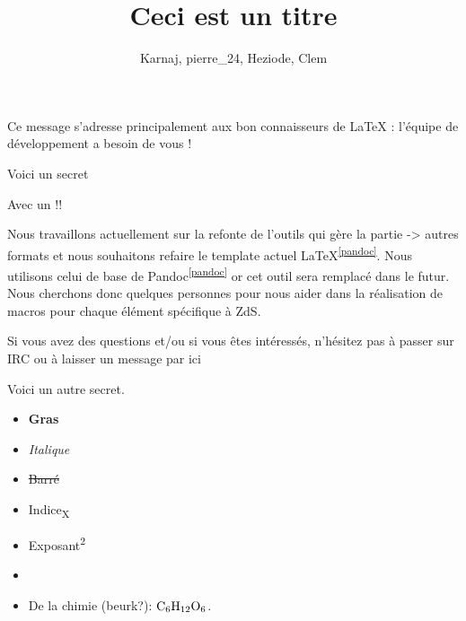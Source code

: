 \documentclass[small]{zmdocument}
\title{Ceci est un titre}
\author{Karnaj, pierre\_24, Heziode, Clem}
\begin{document}
\maketitle
\tableofcontents
\newpage

\levelOneIntroduction

Ce message s’adresse principalement aux bon connaisseurs de LaTeX : l’équipe de développement a besoin de vous ! 

\begin{Spoiler}
   Voici un secret

   Avec un !!
\end{Spoiler}


Nous travaillons actuellement sur la refonte de l’outils qui gère la partie  -> autres formats et nous souhaitons refaire le template actuel LaTeX\textsuperscript{\ref{pandoc}}. Nous utilisons celui de base de Pandoc\textsuperscript{\ref{pandoc}} or cet outil sera remplacé dans le futur. Nous cherchons donc quelques personnes pour nous aider dans la réalisation de macros pour chaque élément spécifique à ZdS.


Si vous avez des questions et/ou si vous êtes intéressés, n’hésitez pas à passer sur IRC ou à laisser un message par ici 

\begin{Spoiler}
Voici un autre secret.
\end{Spoiler}


\begin{itemize}
\item \textbf{Gras}
\item \textit{Italique}
\item \sout{Barré}
\item Indice\textsubscript{X}
\item Exposant\textsuperscript{2}
\item {}
\item De la chimie (beurk?): $\ce{C6H12O6}$.
\end{itemize}
\end{document}
